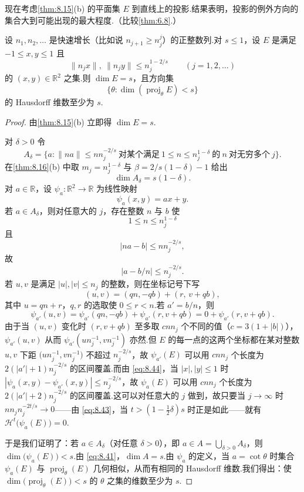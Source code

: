 现在考虑\cref{thm:8.15}(b) 的平面集 $E$ 到直线上的投影.结果表明，投影的例外方向的集合大到可能出现的最大程度.（比较\cref{thm:6.8}.）

\begin{theorem}\label{thm:8.17}
设 $n_1,n_2,\ldots$ 是快速增长（比如说 $n_{j+1}\geq n_j^j$）的正整数列.对 $s\leq 1$，设 $E$ 是满足 $-1\leq x,y\leq 1$ 且
\[
  \|n_j x\|,\ \|n_j y\|\leq n_j^{1-2/s}\qquad(j=1,2,\ldots)
\]
的 $(x,y)\in\mathbb{R}^2$ 之集.则 $\dim E=s$，且方向集
\begin{equation}\label{eq:8.40}
  \{\theta:\dim(\operatorname{proj}_{\theta}E)<s\}
\end{equation}
的 Hausdorff 维数至少为 $s$.
\end{theorem}

\begin{proof}
由\cref{thm:8.15}(b) 立即得 $\dim E=s$.

对 $\delta>0$ 令
\[
  A_{\delta}=\bigl\{a:\|na\|\leq nn_j^{-2/s}\ \text{对某个满足}\ 1\leq n\leq n_j^{1-\delta}\ \text{的}\ n\ \text{对无穷多个}\ j\bigr\}.
\]
在\cref{thm:8.16}(b) 中取 $m_j=n_j^{1-\delta}$ 与 $\beta=2/s(1-\delta)-1$ 给出
\begin{equation}\label{eq:8.41}
  \dim A_{\delta}=s(1-\delta).
\end{equation}
对 $a\in\mathbb{R}$，设 $\psi_a:\mathbb{R}^2\to\mathbb{R}$ 为线性映射
\begin{equation}\label{eq:8.42}
  \psi_a(x,y)=ax+y.
\end{equation}
若 $a\in A_{\delta}$，则对任意大的 $j$，存在整数 $n$ 与 $b$ 使
\begin{equation}\label{eq:8.43}
  1\leq n\leq n_j^{1-\delta}
\end{equation}
且
\[
  |na-b|\leq nn_j^{-2/s},
\]
故
\begin{equation}\label{eq:8.44}
  |a-b/n|\leq n_j^{-2/s}.
\end{equation}
若 $u,v$ 是满足 $|u|,|v|\leq n_j$ 的整数，则在坐标记号下写
\[
  (u,v)=(qn,-qb)+(r,\,v+qb),
\]
其中 $u=qn+r$，$q,r$ 的选取使 $0\leq r<n$.若 $a'=b/n$，则
\[
  \psi_{a'}(u,v)=\psi_{a'}(qn,-qb)+\psi_{a'}(r,v+qb)=0+\psi_{a'}(r,v+qb).
\]
由于当 $(u,v)$ 变化时 $(r,v+qb)$ 至多取 $cnn_j$ 个不同的值（$c=3(1+|b|)$），$\psi_{a'}(u,v)$ 从而 $\psi_{a'}(un_j^{-1},vn_j^{-1})$ 亦然.但 $E$ 的每一点的这两个坐标都在某对整数 $u,v$ 下距 $\bigl(un_j^{-1},vn_j^{-1}\bigr)$ 不超过 $n_j^{-2/s}$，故 $\psi_{a'}(E)$ 可以用 $cnn_j$ 个长度为 $2(|a'|+1)n_j^{-2/s}$ 的区间覆盖.而由 \eqref{eq:8.44}，当 $|x|,|y|\leq 1$ 时 $|\psi_a(x,y)-\psi_{a'}(x,y)|\leq n_j^{-2/s}$，故 $\psi_a(E)$ 可以用 $cnn_j$ 个长度为 $2(|a'|+2)n_j^{-2/s}$ 的区间覆盖.这可以对任意大的 $j$ 做到，故只要当 $j\to\infty$ 时 $nn_jn_j^{-2t/s}\to 0$——由 \eqref{eq:8.43}，当 $t>(1-\frac{1}{2}\delta)s$ 时正是如此——就有 $\mathcal{H}^t\bigl(\psi_a(E)\bigr)=0$.

于是我们证明了：若 $a\in A_{\delta}$（对任意 $\delta>0$），即 $a\in A=\bigcup_{\delta>0}A_{\delta}$，则 $\dim\bigl(\psi_a(E)\bigr)<s$.由 \eqref{eq:8.41}，$\dim A=s$.由 $\psi_a$ 的定义，当 $a=\cot\theta$ 时集合 $\psi_a(E)$ 与 $\operatorname{proj}_{\theta}(E)$ 几何相似，从而有相同的 Hausdorff 维数.我们得出：使 $\dim\bigl(\operatorname{proj}_{\theta}(E)\bigr)<s$ 的 $\theta$ 之集的维数至少为 $s$.
\end{proof}

